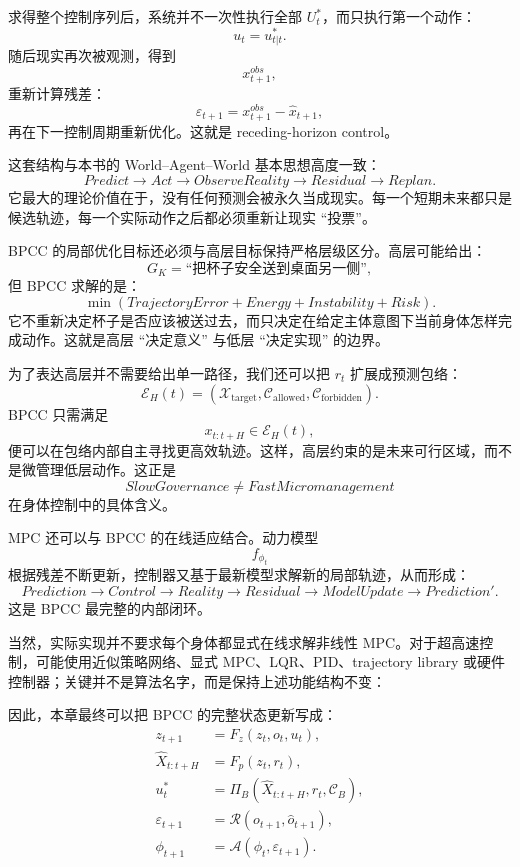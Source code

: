 求得整个控制序列后，系统并不一次性执行全部 $U_t^\ast$，而只执行第一个动作：
\[
u_t=u_{t|t}^\ast.
\]
随后现实再次被观测，得到
\[
x_{t+1}^{obs},
\]
重新计算残差：
\[
\varepsilon_{t+1}
=
x_{t+1}^{obs}
-
\hat x_{t+1},
\]
再在下一控制周期重新优化。这就是 receding-horizon control。

这套结构与本书的 World--Agent--World 基本思想高度一致：
\[
Predict
\rightarrow
Act
\rightarrow
ObserveReality
\rightarrow
Residual
\rightarrow
Replan.
\]
它最大的理论价值在于，没有任何预测会被永久当成现实。每一个短期未来都只是候选轨迹，每一个实际动作之后都必须重新让现实 ``投票''。

BPCC 的局部优化目标还必须与高层目标保持严格层级区分。高层可能给出：
\[
G_K=
\text{``把杯子安全送到桌面另一侧''},
\]
但 BPCC 求解的是：
\[
\min
\left(
TrajectoryError
+
Energy
+
Instability
+
Risk
\right).
\]
它不重新决定杯子是否应该被送过去，而只决定在给定主体意图下当前身体怎样完成动作。这就是高层 ``决定意义'' 与低层 ``决定实现'' 的边界。

为了表达高层并不需要给出单一路径，我们还可以把 $r_t$ 扩展成预测包络：
\[
\mathcal E_H(t)
=
\left(
\mathcal X_{\mathrm{target}},
\mathcal C_{\mathrm{allowed}},
\mathcal C_{\mathrm{forbidden}}
\right).
\]
BPCC 只需满足
\[
x_{t:t+H}
\in
\mathcal E_H(t),
\]
便可以在包络内部自主寻找更高效轨迹。这样，高层约束的是未来可行区域，而不是微管理低层动作。这正是
\[
SlowGovernance
\neq
FastMicromanagement
\]
在身体控制中的具体含义。

MPC 还可以与 BPCC 的在线适应结合。动力模型
\[
f_{\phi_t}
\]
根据残差不断更新，控制器又基于最新模型求解新的局部轨迹，从而形成：
\[
Prediction
\rightarrow
Control
\rightarrow
Reality
\rightarrow
Residual
\rightarrow
ModelUpdate
\rightarrow
Prediction'.
\]
这是 BPCC 最完整的内部闭环。

当然，实际实现并不要求每个身体都显式在线求解非线性 MPC。对于超高速控制，可能使用近似策略网络、显式 MPC、LQR、PID、trajectory library 或硬件控制器；关键并不是算法名字，而是保持上述功能结构不变：
\begin{statementbox}
\centering
{}
\end{statementbox}

因此，本章最终可以把 BPCC 的完整状态更新写成：
\[
\boxed{
\begin{aligned}
z_{t+1}
&=
F_z(
z_t,o_t,u_t
),\\
\hat X_{t:t+H}
&=
F_p(
z_t,r_t
),\\
u_t^\ast
&=
\Pi_B(
\hat X_{t:t+H},
r_t,
\mathcal C_B
),\\
\varepsilon_{t+1}
&=
\mathcal R(
o_{t+1},
\hat o_{t+1}
),\\
\phi_{t+1}
&=
\mathcal A(
\phi_t,
\varepsilon_{t+1}
).
\end{aligned}
}
\]

